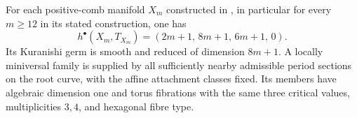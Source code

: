 \begin{proposition}\hypertarget{tag-01GM}{}\label{cdp:st:E15}


For each positive-comb manifold $X_m$ constructed in
\cite{Viaclovsky2026Combs}, in particular for every $m\geq12$ in
its stated construction, one has
\[
 h^\bullet(X_m,T_{X_m})=(2m+1,\,8m+1,\,6m+1,\,0).
\]
Its Kuranishi germ is smooth and reduced of dimension $8m+1$.
A locally miniversal family is supplied by all sufficiently nearby
admissible period sections on the root curve, with the affine
attachment classes fixed. Its members have algebraic dimension one
and torus fibrations with the same three critical values,
multiplicities $3,4$, and hexagonal fibre type.
\end{proposition}

